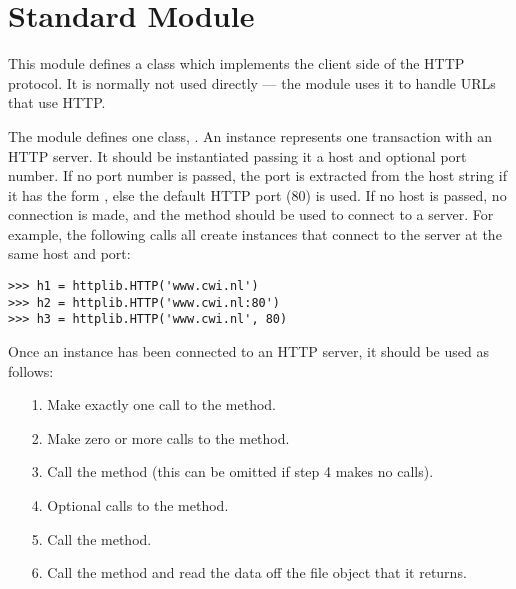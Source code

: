\section{Standard Module }

\renewcommand{\indexsubitem}{(in module httplib)}

This module defines a class which implements the client side of the
HTTP protocol.  It is normally not used directly --- the module
 uses it to handle URLs that use HTTP.

The module defines one class, .  An  instance
represents one transaction with an HTTP server.  It should be
instantiated passing it a host and optional port number.  If no port
number is passed, the port is extracted from the host string if it has
the form , else the default HTTP port (80) is used.
If no host is passed, no connection is made, and the 
method should be used to connect to a server.  For example, the
following calls all create instances that connect to the server at the
same host and port:

\begin{verbatim}
>>> h1 = httplib.HTTP('www.cwi.nl')
>>> h2 = httplib.HTTP('www.cwi.nl:80')
>>> h3 = httplib.HTTP('www.cwi.nl', 80)
\end{verbatim}

Once an  instance has been connected to an HTTP server, it
should be used as follows:

\begin{enumerate}

\item[1.] Make exactly one call to the  method.

\item[2.] Make zero or more calls to the  method.

\item[3.] Call the  method (this can be omitted if
step 4 makes no calls).

\item[4.] Optional calls to the  method.

\item[5.] Call the  method.

\item[6.] Call the  method and read the data off the
file object that it returns.

\end{enumerate}

